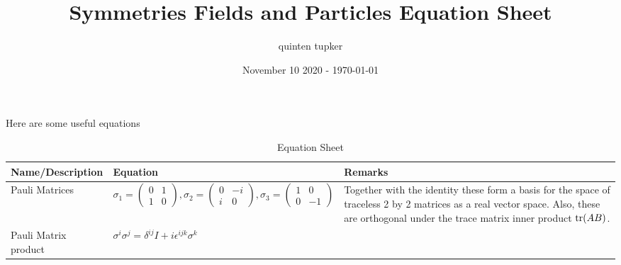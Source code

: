 \documentclass{article}
\title{Symmetries Fields and Particles Equation Sheet}
\author{quinten tupker}
\date{November 10 2020 - \today}
\theoremstyle{definition}
\begin{document}
\maketitle

Here are some useful equations

\begin{table}[H]
  \caption{Equation Sheet}
  \begin{adjustbox}{center}
    \begin{tabular}{|p{5cm}|p{10cm}|p{5cm}|}
      \hline
      \label{equations_1}
      Name/Description & Equation & Remarks \\ \hline
      Pauli Matrices & $\sigma_1 = \begin{pmatrix} 0 & 1 \\ 1 & 0 \end{pmatrix}, \sigma_2 = \begin{pmatrix} 0 & -i \\ i & 0 \end{pmatrix}, \sigma_3 = \begin{pmatrix} 1 & 0 \\ 0 & -1 \end{pmatrix}$ & Together with the identity these form a basis for the space of traceless 2 by 2 matrices as a real vector space. Also, these are orthogonal under the trace matrix inner product $\tr(AB)$. \\ \hline
      Pauli Matrix product & $\sigma^i \sigma^j = \delta^{ij} I + i \epsilon^{ijk} \sigma^k$ & \\ \hline
    \end{tabular}
  \end{adjustbox}
\end{table}
\end{document}
